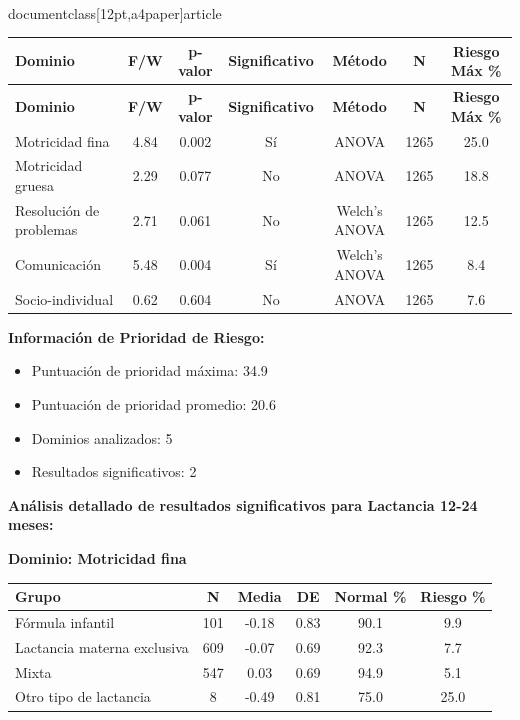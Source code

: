 \\documentclass[12pt,a4paper]{article}
\begin{document}
\begin{longtable}{|l|c|c|c|c|c|c|}
\hline
\textbf{Dominio} & \textbf{F/W} & \textbf{p-valor} & \textbf{Significativo} & \textbf{Método} & \textbf{N} & \textbf{Riesgo Máx \%} \\
\hline
\endfirsthead

\hline
\textbf{Dominio} & \textbf{F/W} & \textbf{p-valor} & \textbf{Significativo} & \textbf{Método} & \textbf{N} & \textbf{Riesgo Máx \%} \\
\hline
\endhead

\hline
\endfoot

\hline
\endlastfoot

Motricidad fina & 4.84 & 0.002 & Sí & ANOVA & 1265 & 25.0 \\
Motricidad gruesa & 2.29 & 0.077 & No & ANOVA & 1265 & 18.8 \\
Resolución de problemas & 2.71 & 0.061 & No & Welch's ANOVA & 1265 & 12.5 \\
Comunicación & 5.48 & 0.004 & Sí & Welch's ANOVA & 1265 & 8.4 \\
Socio-individual & 0.62 & 0.604 & No & ANOVA & 1265 & 7.6 \\

\end{longtable}


\textbf{Información de Prioridad de Riesgo:}
\begin{itemize}
\item Puntuación de prioridad máxima: 34.9
\item Puntuación de prioridad promedio: 20.6
\item Dominios analizados: 5
\item Resultados significativos: 2
\end{itemize}


\textbf{Análisis detallado de resultados significativos para Lactancia 12-24 meses:}


\textbf{Dominio: Motricidad fina}


\begin{center}
\begin{tabular}{|l|c|c|c|c|c|}
\hline
\textbf{Grupo} & \textbf{N} & \textbf{Media} & \textbf{DE} & \textbf{Normal \%} & \textbf{Riesgo \%} \\
\hline
Fórmula infantil & 101 & -0.18 & 0.83 & 90.1 & 9.9 \\
Lactancia materna exclusiva & 609 & -0.07 & 0.69 & 92.3 & 7.7 \\
Mixta & 547 & 0.03 & 0.69 & 94.9 & 5.1 \\
Otro tipo de lactancia & 8 & -0.49 & 0.81 & 75.0 & 25.0 \\

\hline
\end{tabular}
\end{center}
\end{document}
